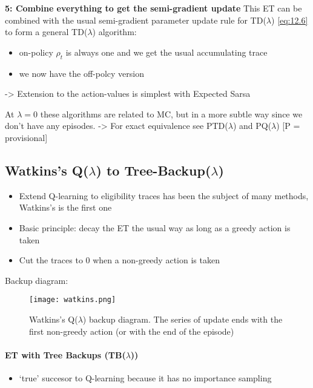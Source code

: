 \documentclass[sutton_barto_notes.tex]{subfiles}
\begin{document}
 \textbf{5: Combine everything to get the semi-gradient update} 
This ET can be combined with the usual semi-gradient parameter update rule for TD($\lambda$) \ref{eq:12.6} to form a general TD($\lambda$) algorithm: 
\begin{itemize}
\item on-policy $\rho_t$ is always one and we get the usual accumulating trace 
\item we now have the off-polcy version 
\end{itemize}

 -> Extension to the action-values is simplest with Expected Sarsa 

 At $\lambda = 0$ these algorithms are related to MC, but in a more subtle way since we don’t have any episodes.
-> For exact equivalence see PTD($\lambda$) and PQ($\lambda$) [P = provisional] 

\subsection{Watkins’s Q($\lambda$) to Tree-Backup($\lambda$)}

\begin{itemize}
\item Extend Q-learning to eligibility traces has been the subject of many methods, Watkins’s is the first one 
\item Basic principle: decay the ET the usual way as long as a greedy action is taken 
\item Cut the traces to $0$ when a non-greedy action is taken 
\end{itemize}

 Backup diagram: 

\begin{figure}[h!]
    \centering
     \texttt{[image: watkins.png]}
    \caption{ Watkins's Q($\lambda$) backup diagram. The series of update ends with the first non-greedy action (or with the end of the episode) }
\end{figure}


\paragraph{ET with Tree Backups (TB($\lambda$))}
\begin{itemize}
\item ‘true’ succesor to Q-learning because it has no importance sampling 
\end{itemize}
\end{document}
